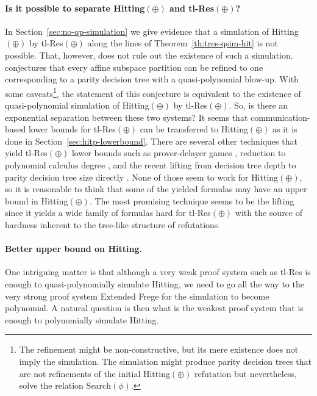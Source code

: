 \documentclass[11pt]{article}
\newcommand{\scterm}[1]{{\textrm{\sc #1}}}
\newcommand{\hit}{\scterm{Hitting}}
\newcommand{\tres}{\scterm{tl-Res}}
\newcommand{\tresp}{{\tres}$(\oplus)$}
\newcommand{\F}{\scterm{Frege}}
\newcommand{\EF}{\scterm{Extended {\F}}}
\newcommand{\hitp}{{\hit}$(\oplus)$}
\newcommand{\Search}{\mathrm{Search}}
\numberwithin{equation}{section}
\begin{document}
\paragraph{Is it possible to separate {\hitp} and {\tresp}?} 
In Section~\ref{sec:no-qp-simulation} we give evidence that a simulation of {\hitp} by {\tresp} along the lines of Theorem~\ref{th:tres-qsim-hit} is not possible. That, however, does not rule out the existence of such a simulation.  \cite[Conjecture~5.1.3]{SS21} conjectures that every affine subspace partition can be refined to one corresponding to a parity decision tree with a quasi-polynomial blow-up. With some caveats\footnote{The refinement might be non-constructive, but its mere existence does not imply the simulation. The simulation might produce parity decision trees that are not refinements of the initial {\hitp} refutation but nevertheless, solve the relation $\Search(\phi)$.}, the statement of this conjecture is equivalent to the existence of  quasi-polynomial simulation of {\hitp} by {\tresp}. So, is there an exponential separation between these two systems? It seems that communication-based lower bounds for {\tresp} can be transferred to {\hitp} as it is done in Section~\ref{sec:hitp-lowerbound}. There are several other techniques that yield {\tresp} lower bounds such as prover-delayer games \cite{IS20,Gry19}, reduction to polynomial calculus degree \cite{GK18}, and the recent lifting from decision tree depth to parity decision tree size directly \cite{CMSS22,BK22}. None of those seem to work for {\hitp}, so it is reasonable to think that some of the yielded formulas may have an upper bound in {\hitp}. The most promising technique seems to be the lifting since it yields a wide family of formulas hard for {\tresp} with the source of hardness inherent to the tree-like structure of refutations.



\paragraph{Better upper bound on {\hit}.} One intriguing matter is that although a very weak proof system such as {\tres} is enough to quasi-polynomially simulate {\hit}, we need to go all the way to the very strong proof system {\EF} for the simulation to become polynomial. A natural question is then what is the weakest proof system that is enough to polynomially simulate {\hit}.
\end{document}
